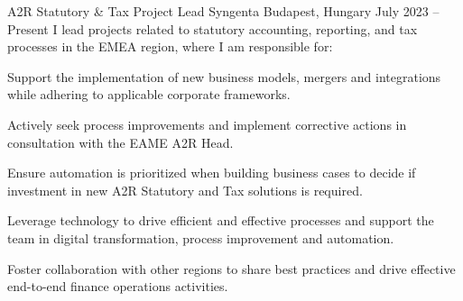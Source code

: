 


\begin{cventries}


  \cventry
    {A2R Statutory \& Tax Project Lead} %
    {Syngenta} %
    {Budapest, Hungary} %
    {July 2023 -- Present} %
    {I lead projects related to statutory accounting, reporting, and tax processes in the EMEA region, where I am responsible for:} %
    {
      \begin{cvitems} %
        \item {Support the implementation of new business models, mergers and integrations while adhering to applicable corporate frameworks.}
        \item {Actively seek process improvements and implement corrective actions in consultation with the EAME A2R Head.}
        \item {Ensure automation is prioritized when building business cases to decide if investment in new A2R Statutory and Tax solutions is required.}
        \item {Leverage technology to drive efficient and effective processes and support the team in digital transformation, process improvement and automation.}
        \item {Foster collaboration with other regions to share best practices and drive effective end-to-end finance operations activities.}
      \end{cvitems}
    }



\end{cventries}
